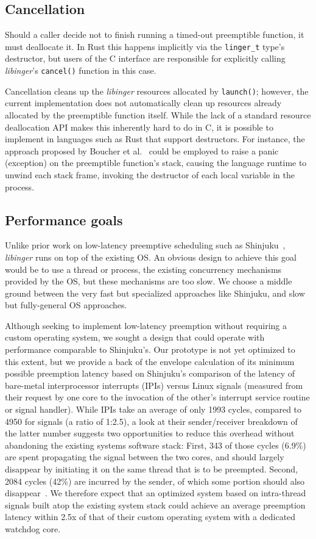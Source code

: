 \subsection{Cancellation}

Should a caller decide not to finish running a timed-out preemptible function, it
must deallocate it.  In Rust this happens implicitly via the \texttt{linger\_t}
type's destructor, but users of the C interface are responsible for explicitly
calling \textit{libinger}'s \texttt{cancel()} function in this case.

Cancellation cleans up the \textit{libinger} resources allocated by
\texttt{launch()};
however, the current implementation
does not automatically clean up resources already allocated by the
preemptible function itself.  While the lack of a standard resource deallocation API
makes this inherently hard to do in C, it is possible to implement in languages
such as Rust that support destructors.  For instance, the approach proposed by
Boucher et al.~\cite{boucher:atc2018} could be employed to raise a panic
(exception) on the preemptible function's stack, causing the language runtime
to unwind each stack frame, invoking the destructor of each local variable in
the process.


\subsection{Performance goals}

Unlike prior work on low-latency preemptive scheduling such as
Shinjuku~\cite{Kaffes:nsdi2019}, \textit{libinger} runs on top of the existing
OS. An obvious design to achieve this goal would be to use a thread or process,
the existing concurrency mechanisms provided by the OS, but these mechanisms
are too slow. We choose a middle ground between the very fast but specialized
approaches like Shinjuku, and slow but fully-general OS approaches.

Although seeking to implement low-latency preemption without requiring a custom
operating system, we sought a design that could operate with performance
comparable to Shinjuku's.  Our prototype is not yet optimized to this extent,
but we provide a back of the envelope calculation of its minimum possible
preemption latency based on Shinjuku's comparison of the latency of bare-metal
interprocessor interrupts (IPIs) versus Linux signals (measured from their
request by one core to the invocation of the other's interrupt service routine
or signal handler).  While IPIs take an average of only 1993 cycles, compared
to 4950 for signals (a ratio of 1:2.5), a look at their sender/receiver
breakdown of the latter number suggests two opportunities to reduce this
overhead without abandoning the existing systems software stack:  First, 343 of
those cycles (6.9\%) are spent propagating the signal between the two cores,
and should largely disappear by initiating it on the same thread that is to be
preempted.  Second, 2084 cycles (42\%) are incurred by the sender, of which
some portion should also disappear~\cite{Kaffes:nsdi2019}.  We therefore expect
that an optimized system based on intra-thread signals built atop the existing
system stack could achieve an average preemption latency within 2.5x of that of
their custom operating system with a dedicated watchdog core.
